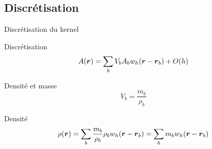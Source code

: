 \subsection{Discrétisation}
\begin{frame}[<+->]{Discrétisation du kernel}
 
 \begin{block}{Discrétisation}
 \begin{equation*}
  A({\boldsymbol {r}})=\sum _{b}V_{b}A_bw_{h}({\boldsymbol {r}}-{\boldsymbol {r}}_b)+O(h)
  \end{equation*}
 \end{block}

 \begin{block}{Densité et masse}
 \begin{equation*}
  V_{b}=\frac{m_{b}}{\rho_{b}}
 \end{equation*}
 \end{block}
 
 \begin{block}{Densité}
  \begin{equation*}
   \rho({\boldsymbol {r}})=\sum_b \frac{m_b}{\rho_{b}}\rho_{b}w_{h}({\boldsymbol {r}}-{\boldsymbol {r}}_b)=\sum_b m_bw_{h}({\boldsymbol {r}}-{\boldsymbol {r}}_b)
  \end{equation*}
 \end{block}

\end{frame}

